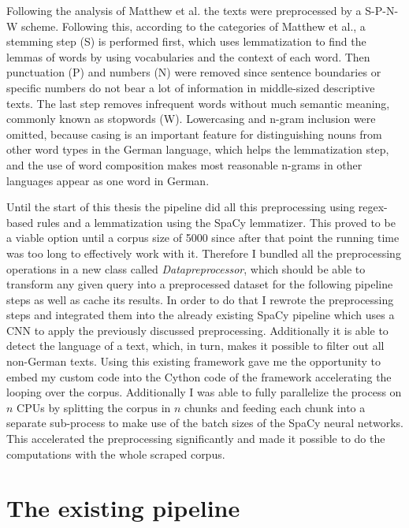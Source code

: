 Following the analysis of Matthew et al. \cite{dennymatthewpennstateuniversity;spirlingarthurnewyorkuniversityReplicationDataText2017} the texts were preprocessed by a S-P-N-W scheme. 
Following this, according to the categories of Matthew et al., a stemming step (S) is performed first, which uses lemmatization to find the lemmas of words by using vocabularies and the context of each word.
Then punctuation (P) and numbers (N) were removed since sentence boundaries or specific numbers do not bear a lot of information in middle-sized descriptive texts. The last step removes infrequent words without much semantic meaning, commonly known as stopwords (W). Lowercasing and n-gram inclusion were omitted, because casing is an important feature for distinguishing nouns from other word types in the German language, which helps the lemmatization step, and the use of word composition makes most reasonable n-grams in other languages appear as one word in German. 

Until the start of this thesis the pipeline did all this preprocessing using regex-based rules and a lemmatization using the SpaCy lemmatizer. This proved to be a viable option until a corpus size of 5000 since after that point the running time was too long to effectively work with it. Therefore I bundled all the preprocessing operations in a new class called \textit{Datapreprocessor}, which should be able to transform any given query into a preprocessed dataset for the following pipeline steps as well as cache its results. In order to do that I rewrote the preprocessing steps and integrated them into the already existing SpaCy pipeline which uses a CNN to apply the previously discussed preprocessing. Additionally it is able to detect the language of a text, which, in turn, makes it possible to filter out all non-German texts. Using this existing framework gave me the opportunity to embed my custom code into the Cython code of the framework accelerating the looping over the corpus. Additionally I was able to fully parallelize the process on $n$ CPUs by splitting the corpus in $n$ chunks and feeding each chunk into a separate sub-process to make use of the batch sizes of the SpaCy neural networks. This accelerated the preprocessing significantly and made it possible to do the computations with the whole scraped corpus.

\section{The existing pipeline}

